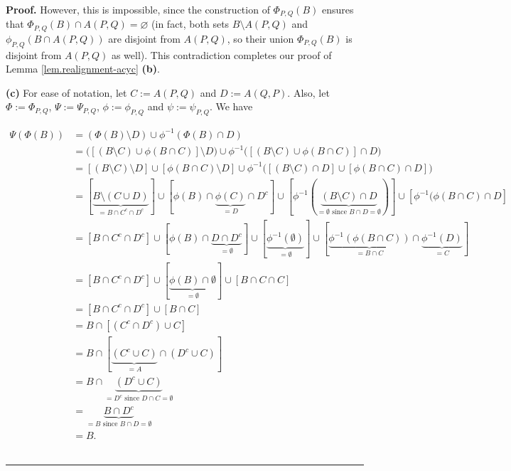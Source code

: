 \documentclass[numbers=enddot,12pt,final,onecolumn,notitlepage]{scrartcl}%
\theoremstyle{definition}
\newenvironment{proof}[1][Proof]{\noindent\textbf{#1.} }{\ \rule{0.5em}{0.5em}}
\theoremstyle{plainsl}
\begin{document}
\begin{proof}
However, this is impossible, since the construction of $\Phi_{P,Q}\left(
B\right)  $ ensures that $\Phi_{P,Q}\left(  B\right)  \cap A\left(
P,Q\right)  =\varnothing$ (in fact, both sets $B\setminus A\left(  P,Q\right)
$ and $\phi_{P,Q}\left(  B\cap A\left(  P,Q\right)  \right)  $ are disjoint
from $A\left(  P,Q\right)  $, so their union $\Phi_{P,Q}\left(  B\right)  $ is
disjoint from $A\left(  P,Q\right)  $ as well). This contradiction completes
our proof of Lemma \ref{lem.realignment-acyc} \textbf{(b)}. \medskip

\textbf{(c)} For ease of notation, let $C := A(P,Q)$ and $D := A(Q,P)$. Also, let $\Phi := \Phi_{P,Q}$, $\Psi := \Psi_{P,Q}$, $\phi := \phi_{P,Q}$ and $\psi := \psi_{P,Q}$. We have 

\begin{align*}
    \Psi(\Phi(B)) &= (\Phi(B) \setminus D) \cup \phi^{-1}(\Phi(B) \cap D) \\
    &= \Big([(B \setminus C) \cup \phi(B \cap C)] \setminus D \Big) \cup \phi^{-1}\Big([(B \setminus C) \cup \phi(B \cap C)] \cap D\Big) \\
    &= [(B \setminus C) \setminus D] \cup [\phi(B \cap C) \setminus D] \cup \phi^{-1}\Big([(B \setminus C) \cap D] \cup [\phi(B \cap C) \cap D]\Big) \\
    &= [\underbrace{B \setminus (C \cup D)}_{=B \cap C^c \cap D^c}] \cup [\phi(B) \cap \underbrace{\phi(C)}_{=D} \cap D^c] \cup [\phi^{-1}(\underbrace{(B \setminus C) \cap D}_{=\emptyset \text{ since }B \cap D = \emptyset})] \cup [\phi^{-1}(\phi(B \cap C) \cap D] \\
    &= [B \cap C^c \cap D^c] \cup [\phi(B) \cap \underbrace{D \cap D^c}_{=\emptyset}] \cup [\underbrace{\phi^{-1}(\emptyset)}_{=\emptyset}] \cup [\underbrace{\phi^{-1}(\phi(B\cap C))}_{=B \cap C} \cap \underbrace{\phi^{-1}(D)}_{=C}] \\
    &= [B \cap C^c \cap D^c] \cup [\underbrace{\phi(B) \cap \emptyset}_{=\emptyset}] \cup [B \cap C \cap C] \\
    &= [B \cap C^c \cap D^c] \cup [B \cap C] \\
    &= B \cap [(C^c \cap D^c) \cup C] \\
    &= B \cap [\underbrace{(C^c \cup C)}_{=A} \cap (D^c \cup C)] \\
    &= B \cap \underbrace{(D^c \cup C)}_{=D^c \text{ since } D \cap C = \emptyset} \\
    &= \underbrace{B \cap D^c}_{=B \text{ since } B \cap D = \emptyset} \\
    &= B.
\end{align*} \end{proof}
\end{document}
